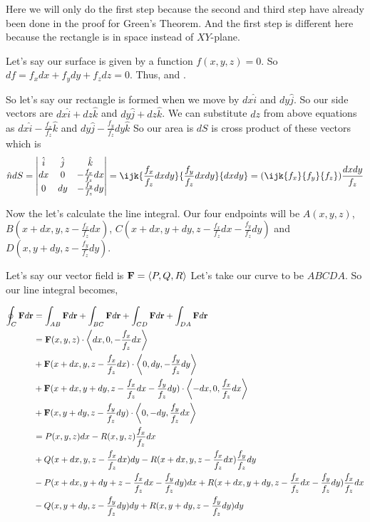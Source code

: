 Here we will only do the first step because the second and third step have already been done in the proof for Green's Theorem.
And the first step is different here because the rectangle is in space instead of $XY$-plane.

Let's say our surface is given by a function $f(x, y, z) = 0$. 
So $df = f_x dx + f_y dy + f_z dz = 0$. 
Thus,  and .

So let's say our rectangle is formed when we move by $dx \hat{i}$ and $dy \hat{j}$.
So our side vectors are $dx \hat{i} + dz \hat{k}$ and $dy \hat{j} + dz \hat{k}$.
We can substitute $dz$ from above equations as $dx \hat{i} - \frac{f_x}{f_z}\hat{k}$ and $dy \hat{j} - \frac{f_y}{f_z} dy \hat{k}$
So our area is $dS$ is cross product of these vectors which is 
$$
\hat{n} dS = \begin{vmatrix}
    \hat{i} & \hat{j} & \hat{k} \\
    dx & 0 & -\frac{f_x}{f_z} dx \\
    0 & dy & -\frac{f_y}{f_z} dy \\
\end{vmatrix} 
= \ijk{\frac{f_x}{f_z} dx dy }{\frac{f_y}{f_z} dx dy}{dx dy}
= ( \ijk{f_x}{f_y}{f_z} )\frac{dx dy}{f_z}
$$

Now the let's calculate the line integral. 
Our four endpoints will be  
$A(x, y, z)$, 
$B(x+dx, y, z - \frac{f_x}{f_z} dx)$, 
$C(x+dx, y+dy, z - \frac{f_x}{f_z}dx - \frac{f_y}{f_z} dy)$
and $D(x, y+dy, z - \frac{f_y}{f_z} dy)$.

\pagebreak

Let's say our vector field is ${\bf F} = \left< P, Q, R \right>$
Let's take our curve to be $ABCDA$. So our line integral becomes,


\begin{align*}
\oint_C {\bf F} d{\bf r} & = 
    \int_{AB} {\bf F} d{\bf r} +
    \int_{BC} {\bf F} d{\bf r} +
    \int_{CD} {\bf F} d{\bf r} +
    \int_{DA} {\bf F} d{\bf r} \\
    & = {\bf F}(x, y, z) \cdot 
        \left< dx, 0, - \frac{f_x}{f_z} dx \right> \\
    & + {\bf F}(x + dx, y, z - \frac{f_x}{f_z} dx) \cdot 
        \left< 0, dy, - \frac{f_y}{f_z} dy \right> \\
    & + {\bf F}(x + dx, y + dy, z - \frac{f_x}{f_z} dx - \frac{f_y}{f_z} dy) \cdot 
        \left< - dx, 0, \frac{f_x}{f_z} dx \right> \\
    & + {\bf F}(x, y + dy, z - \frac{f_y}{f_z} dy) \cdot 
        \left< 0, - dy, \frac{f_y}{f_z} dx \right> \\
    & = P(x, y, z) dx - R(x, y, z) \frac{f_x}{f_z} dx \\
    & + Q(x + dx, y, z - \frac{f_x}{f_z} dx) dy - R(x + dx, y, z - \frac{f_x}{f_z} dx) \frac{f_y}{f_z} dy \\
    & - P(x + dx, y + dy + z - \frac{f_x}{f_z} dx - \frac{f_y}{f_z} dy) dx 
        + R(x + dx, y + dy, z - \frac{f_x}{f_z} dx - \frac{f_y}{f_z} dy) \frac{f_x}{f_z} dx \\
    & - Q(x, y + dy, z - \frac{f_y}{f_z} dy) dy + R(x, y + dy, z - \frac{f_y}{f_z} dy) dy
\end{align*}

